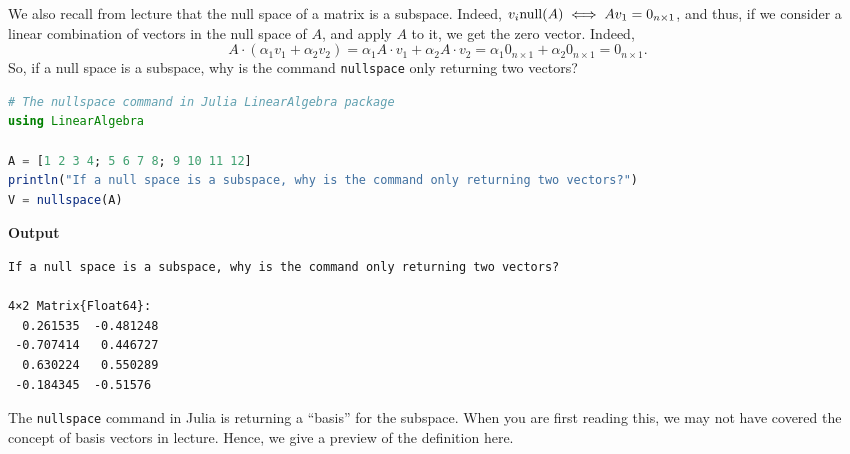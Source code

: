 We also recall from lecture that the null space of a matrix is a subspace. Indeed, $v_i \mathrm{null}(A) \iff A v_1 = 0_{n \times 1}$, and thus, if we consider a linear combination of vectors in the null space of $A$, and apply $A$ to it, we get the zero vector. Indeed, 
$$A \cdot(\alpha_1 v_1 + \alpha_2 v_2) = \alpha_1 A \cdot v_1 + \alpha_2 A \cdot v_2 = \alpha_1 0_{n \times 1} + \alpha_2 0_{n \times 1}  =  0_{n \times 1}.$$
So, if a null space is a subspace, why is the command \texttt{nullspace} only returning two vectors? \\

\begin{lstlisting}[language=Julia,style=mystyle]
# The nullspace command in Julia LinearAlgebra package
using LinearAlgebra

A = [1 2 3 4; 5 6 7 8; 9 10 11 12]
println("If a null space is a subspace, why is the command only returning two vectors?")
V = nullspace(A)
\end{lstlisting}
\textbf{Output} 
\begin{verbatim}
If a null space is a subspace, why is the command only returning two vectors?

4×2 Matrix{Float64}:
  0.261535  -0.481248
 -0.707414   0.446727
  0.630224   0.550289
 -0.184345  -0.51576
\end{verbatim}

The \texttt{nullspace} command in Julia is returning a ``basis'' for the subspace. When you are first reading this, we may not have covered the concept of basis vectors in lecture. Hence, we give a preview of the definition here.


